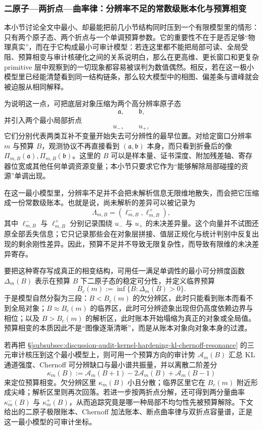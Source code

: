\subsubsection{二原子—两折点—曲率律：分辨率不足的常数级账本化与预算相变}\label{subsubsec:discussion-two-atom-ledger-curvature-bias-toy-rh}
本小节讨论全文中最小、却最能把前几小节结构同时压到一个有限模型里的情形：只有两个原子态、两个折点与一个单调预算参数。它的重要性不在于是否足够“物理真实”，而在于它构成最小可审计模型：若连这里都不能把局部可读、全局受阻、预算相变与审计核硬化之间的关系说明白，那么在更高维、更长窗口和更复杂 primitive 层中观察到的一切现象都容易被误判为数值偶然。相反，若在这一极小模型里已经能清楚看到同一结构链条，那么较大模型中的相图、偏差条与谱峰就会被迫服从相同解释。

为说明这一点，可把底层对象压缩为两个高分辨率原子态
\[
\mathfrak a,\qquad \mathfrak b,
\]
并引入两个最小局部折点
\[
u_-,\qquad u_+,
\]
它们分别代表两类互补不变量开始失去可分辨性的最早位置。对给定窗口分辨率 \(m\) 与预算 \(B\)，观测协议不再直接看到 \((\mathfrak a,\mathfrak b)\) 本身，而只看到折叠后的像 \(\Pi_{m,B}(\mathfrak a),\Pi_{m,B}(\mathfrak b)\)。这里的 \(B\) 可以是样本量、证书深度、附加残差轴、寄存器位宽或其他任何单调资源变量；本小节只要求它作为“能够解除局部碰撞的资源”单调出现。

在这一最小模型里，分辨率不足并不会把未解析信息无限维地散失，而会把它压缩成一份常数级账本。也就是说，尚未解析的差异可以被记录为
\[
\Lambda_{m,B}=(\ell^-_{m,B},\ell^+_{m,B}),
\]
其中 \(\ell^-_{m,B}\) 与 \(\ell^+_{m,B}\) 分别记录围绕 \(u_-\) 与 \(u_+\) 的未决差异量。这个向量并不试图还原全部丢失信息；它只记录那些会在对象层拼接、值层正规化与统计判别中反复出现的剩余刚性差异。因此，预算不足并不导致无限复杂性，而导致有限维的未决差异寄存。

要把这种寄存写成真正的相变结构，可用任一满足单调性的最小可分辨度函数 \(\Delta_m(B)\) 表示在预算 \(B\) 下二原子态的稳定可分性，并定义临界预算
\[
B_c(m):=\inf\{B:\Delta_m(B)>0\}.
\]
于是模型自然分裂为三段：\(B<B_c(m)\) 的欠分辨区，此时只能看到账本而看不到全局对象；\(B\approx B_c(m)\) 的临界区，此时可分辨迹象出现但仍高度依赖边界与相位；以及 \(B>B_c(m)\) 的解析区，此时账本开始塌缩为真正的对象或全局值。预算相变的本质因此不是“图像逐渐清晰”，而是从账本对象向对象本身的过渡。

若再把 \S\ref{subsubsec:discussion-audit-kernel-hardening-kl-chernoff-resonance} 的三元审计核压到这个最小模型上，则可用一个预算方向的审计势 \(\mathcal A_m(B)\) 汇总 KL 通道强度、Chernoff 可分辨缺口与最小谱共振量，并以离散二阶差分
\[
\kappa_m(B):=\mathcal A_m(B+1)-2\mathcal A_m(B)+\mathcal A_m(B-1)
\]
来定位预算相变。欠分辨区里 \(\kappa_m(B)\) 小且分散；临界区里它在 \(B_c(m)\) 附近形成尖峰；解析区里则再次回落。若进一步按两折点分解，还可得到两分量曲率 \(\kappa_m^-(B)\) 与 \(\kappa_m^+(B)\)，从而追踪究竟是哪一种局部不均匀性先被预算解除。下文给出的二原子极限账本、Chernoff 加法账本、断点曲率律与双折点容量谱，正是这一最小模型的可审计坐标。

